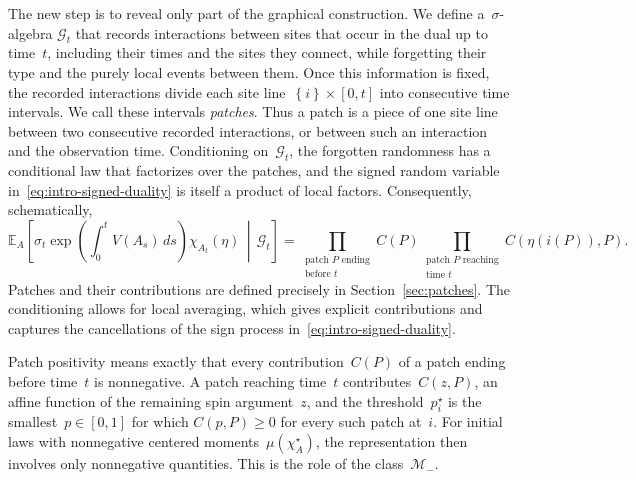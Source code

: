 \documentclass[EJP,preprint,NODS,nobera]{ejpecp}
\newcommand{\E}{\mathbb{E}}
\newcommand{\bb}[1]{\left(#1\right)}
\newcommand{\Cb}[1]{\left[#1\right]}
\newcommand{\cb}[1]{\left\{#1\right\}}
\begin{document}
The new step is to reveal only part of the graphical construction. We define a~$\sigma$-algebra
$\mathcal G_t$ that records interactions between sites that occur in the
dual up to time~$t$, including their times and the sites they connect, while
forgetting their type and the purely local events between them. Once this
information is fixed, the recorded interactions divide each site line~$\cb{i}\times[0,t]$ into
consecutive time intervals. We call these intervals \emph{patches}. Thus a
patch is a piece of one site line between two consecutive recorded
interactions, or between such an interaction and the observation time.
Conditioning on~$\mathcal G_t$, the forgotten randomness has a conditional
law that factorizes over the patches, and the signed random variable
in~\eqref{eq:intro-signed-duality} is itself a product of local factors.
Consequently, schematically,
\begin{equation}
\label{eq:intro-patch-factorization}
\E_A\Cb{
\sigma_t
\exp\bb{\int_0^t V(A_s)\,ds}
\chi_{A_t}(\eta)
\,\middle|\,
\mathcal G_t
}
=
\prod_{\substack{ \text{patch }P\text{ ending}\\\text{before }t}} C(P)
\prod_{\substack{\text{patch }P\text{ reaching}\\\text{time }t}}
C\bb{\eta\bb{i(P)},P}.
\end{equation}
Patches and their contributions are defined precisely in
Section~\ref{sec:patches}. The conditioning allows for local averaging, which
gives explicit contributions and captures the cancellations of the sign
process in~\eqref{eq:intro-signed-duality}.

Patch positivity means exactly that every contribution~$C(P)$ of a patch
ending before time~$t$ is nonnegative. A patch reaching time~$t$
contributes~$C(z,P)$, an affine function of the remaining spin argument~$z$,
and the threshold~$p_i^\star$ is the smallest~$p\in[0,1]$ for which
$C(p,P)\geq0$ for every such patch at~$i$. For initial laws with nonnegative
centered moments~$\mu(\chi_A^\star)$, the representation then involves only
nonnegative quantities. This is the role of the class~$\mathcal M_-$.
\end{document}
